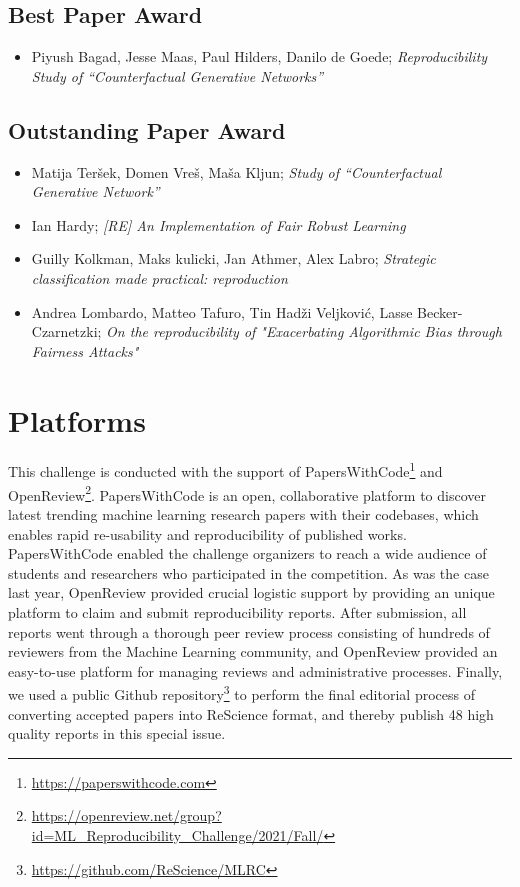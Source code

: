 \subsection{Best Paper Award}

\begin{itemize}
    \item Piyush Bagad, Jesse Maas, Paul Hilders, Danilo de Goede; \textit{Reproducibility Study of “Counterfactual Generative Networks”}
\end{itemize}

\subsection{Outstanding Paper Award}

\begin{itemize}
  \item Matija Teršek, Domen Vreš, Maša Kljun; \textit{Study of “Counterfactual Generative Network''}
  \item Ian Hardy; \textit{[RE] An Implementation of Fair Robust Learning}
  \item Guilly Kolkman, Maks kulicki, Jan Athmer, Alex Labro; \textit{Strategic classification made practical: reproduction}
  \item Andrea Lombardo, Matteo Tafuro, Tin Hadži Veljković, Lasse Becker-Czarnetzki; \textit{On the reproducibility of "Exacerbating Algorithmic Bias through Fairness Attacks"}
\end{itemize}

\section{Platforms}

This challenge is conducted with the support of PapersWithCode\footnote{\url{https://paperswithcode.com}} and OpenReview\footnote{\url{https://openreview.net/group?id=ML_Reproducibility_Challenge/2021/Fall/}}. PapersWithCode is an open, collaborative platform to discover latest trending machine learning research papers with their codebases, which enables rapid re-usability and reproducibility of published works. PapersWithCode enabled the challenge organizers to reach a wide audience
of students and researchers who participated in the competition. As was the case last year, OpenReview provided crucial logistic support by providing an unique platform to claim and submit reproducibility reports. After submission, all reports went through a thorough peer review process consisting of hundreds of reviewers from the Machine Learning
community, and OpenReview provided an easy-to-use platform for managing reviews and administrative processes. Finally, we used a public Github repository\footnote{\url{https://github.com/ReScience/MLRC}} to perform the final editorial process of converting accepted papers into ReScience format, and thereby publish 48 high quality reports in this special issue.

